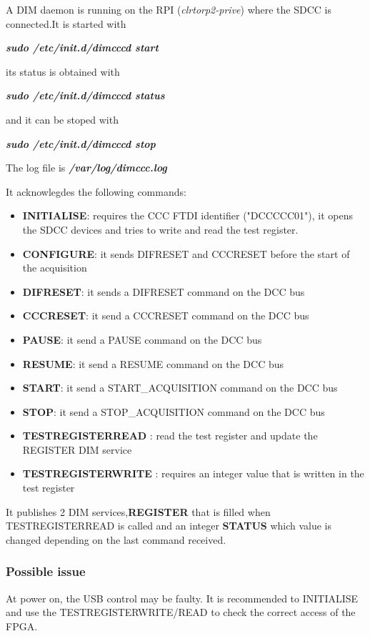 \documentclass[english]{article}
\begin{document}
A DIM daemon is running on the RPI ({\sl clrtorp2-prive}) where the SDCC is connected.It is started with

{\sl \bf sudo /etc/init.d/dimcccd start }

its status is obtained with 

{\sl \bf sudo /etc/init.d/dimcccd status }

and it can be stoped with

{\sl \bf sudo /etc/init.d/dimcccd stop }
 
 The log file is {\sl \bf /var/log/dimccc.log }
 
 It acknowlegdes the following commands:
 \begin{itemize}
\item {\bf INITIALISE}: requires the CCC FTDI identifier ("DCCCCC01"), it opens the SDCC devices and tries to write and read the test register. 
\item {\bf CONFIGURE}: it sends DIFRESET and CCCRESET before the start of the acquisition
\item {\bf DIFRESET}: it sends a DIFRESET command on the DCC bus
\item {\bf CCCRESET}: it send a CCCRESET command on the DCC bus
\item {\bf PAUSE}: it send a PAUSE command on the DCC bus
\item {\bf RESUME}: it send a RESUME command on the DCC bus
\item {\bf START}: it send a START\_ACQUISITION command on the DCC bus
\item {\bf STOP}: it send a STOP\_ACQUISITION command on the DCC bus
\item { \bf TESTREGISTERREAD }: read the test register and update the REGISTER DIM service
\item { \bf TESTREGISTERWRITE }: requires an integer value that is written in the test register
\end{itemize}

It publishes 2 DIM services,{\bf REGISTER} that is filled when TESTREGISTERREAD is called and an integer {\bf STATUS} which value is changed depending on the last command received.
 
\subsubsection{Possible issue}

At power on, the USB control may be faulty. It is recommended to INITIALISE and use the TESTREGISTERWRITE/READ to check the correct access of the FPGA.
\end{document}
